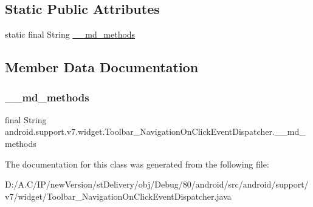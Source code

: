 \subsection*{Static Public Attributes}
\begin{DoxyCompactItemize}
\item 
static final String \hyperlink{classandroid_1_1support_1_1v7_1_1widget_1_1_toolbar___navigation_on_click_event_dispatcher_a97c82ce49b45088298de714d868899df}{\+\_\+\+\_\+md\+\_\+methods}
\end{DoxyCompactItemize}


\subsection{Member Data Documentation}
\mbox{\label{classandroid_1_1support_1_1v7_1_1widget_1_1_toolbar___navigation_on_click_event_dispatcher_a97c82ce49b45088298de714d868899df}} 
\subsubsection{\texorpdfstring{\+\_\+\+\_\+md\+\_\+methods}{\_\_md\_methods}}
{\footnotesize\ttfamily final String android.\+support.\+v7.\+widget.\+Toolbar\+\_\+\+Navigation\+On\+Click\+Event\+Dispatcher.\+\_\+\+\_\+md\+\_\+methods\hspace{0.3cm}{\ttfamily [static]}}



The documentation for this class was generated from the following file\+:\begin{DoxyCompactItemize}
\item 
D\+:/\+A.\+C/\+I\+P/new\+Version/st\+Delivery/obj/\+Debug/80/android/src/android/support/v7/widget/Toolbar\+\_\+\+Navigation\+On\+Click\+Event\+Dispatcher.\+java\end{DoxyCompactItemize}
